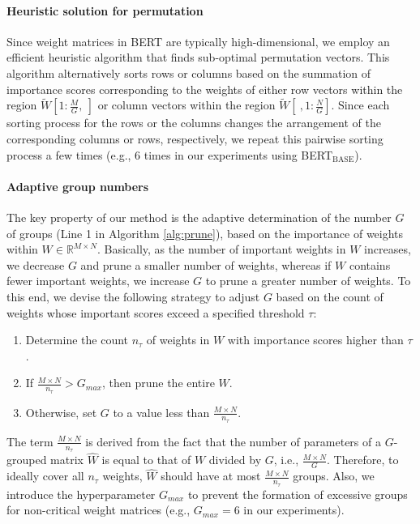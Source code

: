 \paragraph{Heuristic solution for permutation}
Since weight matrices in BERT are typically high-dimensional, we employ an efficient heuristic algorithm \cite{Zhao} that finds sub-optimal permutation vectors. This algorithm alternatively sorts rows or columns based on the summation of importance scores corresponding to the weights of either row vectors within the region $\widetilde{W}[1:\frac{M}{G},~]$ or column vectors within the region $\widetilde{W}[~, 1:\frac{N}{G}]$. Since each sorting process for the rows or the columns changes the arrangement of the corresponding columns or rows, respectively, we repeat this pairwise sorting process a few times (e.g., 6 times in our experiments using BERT$_{\text{BASE}}$).


\paragraph{Adaptive group numbers}
The key property of our method is the adaptive determination of the number $G$ of groups (Line 1 in Algorithm \ref{alg:prune}), based on the importance of weights within $W \in \mathbb{R}^{M \times N}$. Basically, as the number of important weights in $W$ increases, we decrease $G$ and prune a smaller number of weights, whereas if $W$ contains fewer important weights, we increase $G$ to prune a greater number of weights. To this end, we devise the following strategy to adjust $G$ based on the count of weights whose important scores exceed a specified threshold $\tau$:
\begin{enumerate}
    \item Determine the count $n_{\tau}$ of weights in $W$ with importance scores higher than $\tau$.
    \item If $\frac{M\times N}{n_{\tau}} > G_{max}$, then prune the entire $W$.
    \item Otherwise, set $G$ to a value less than $\frac{M\times N}{n_{\tau}}$.
\end{enumerate}
The term $\frac{M\times N}{n_{\tau}}$ is derived from the fact that the number of parameters of a $G$-grouped matrix $\widehat{W}$ is equal to that of $W$ divided by $G$, i.e., $\frac{M\times N}{G}$. Therefore, to ideally cover all $n_{\tau}$ weights, $\widehat{W}$ should have at most $\frac{M\times N}{n_{\tau}}$ groups. Also, we introduce the hyperparameter $G_{max}$ to prevent the formation of excessive groups for non-critical weight matrices (e.g., $G_{max}=6$ in our experiments).

